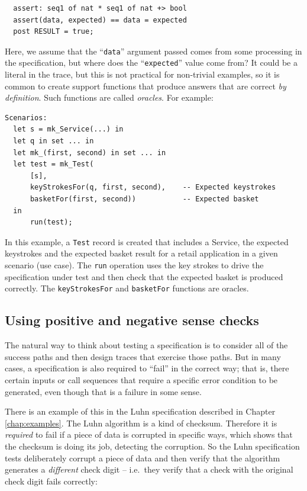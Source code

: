 \documentclass{overturerepchap}
\begin{document}
\scriptsize
\begin{lstlisting}
  assert: seq1 of nat * seq1 of nat +> bool
  assert(data, expected) == data = expected
  post RESULT = true;
\end{lstlisting}
\normalsize

\noindent Here, we assume that the ``\texttt{data}'' argument passed comes from some processing in
the specification, but where does the ``\texttt{expected}'' value come from? It could be
a literal in the trace, but this is not practical for non-trivial examples, so
it is common to create support functions that produce answers that are correct
\emph{by definition}. Such functions are called \emph{oracles}. For example:

\scriptsize
\begin{lstlisting}
Scenarios:
  let s = mk_Service(...) in
  let q in set ... in
  let mk_(first, second) in set ... in 
  let test = mk_Test(
      [s],
      keyStrokesFor(q, first, second),    -- Expected keystrokes
      basketFor(first, second))           -- Expected basket
  in
      run(test);
\end{lstlisting}
\normalsize

\noindent In this example, a \texttt{Test} record is created that includes a Service, the
expected keystrokes and the expected basket result for a retail application in
a given scenario (use case). The \texttt{run} operation uses the key strokes to
drive the specification under test and then check that the expected basket is
produced correctly. The \texttt{keyStrokesFor} and \texttt{basketFor} functions
are oracles.

\subsection{Using positive and negative sense checks}

The natural way to think about testing a specification is to consider all of the
success paths and then design traces that exercise those paths. But in many
cases, a specification is also required to ``fail'' in the correct way; that is,
there certain inputs or call sequences that require a specific error condition
to be generated, even though that is a failure in some sense.

There is an example of this in the Luhn specification described in Chapter
\ref{chap:examples}. The Luhn algorithm is a kind of checksum. Therefore it is
\emph{required} to fail if a piece of data is corrupted in specific ways, which
shows that the checksum is doing its job, detecting the corruption. So the Luhn
specification tests deliberately corrupt a piece of data and then verify that
the algorithm generates a \emph{different} check digit -- i.e.\ they verify that a
check with the original check digit fails correctly:
\end{document}
